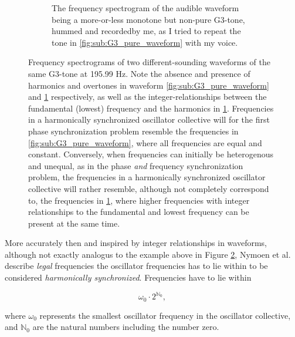 \begin{figure}[ht!]
\begin{subfigure}[t]{.5\textwidth}
		\caption{The frequency spectrogram of the audible waveform being a more-or-less monotone but non-pure G3-tone, hummed and recorded\protect\footnotemark  by me, as I tried to repeat the tone in \ref{fig:sub:G3_pure_waveform} with my voice.}
		\label{fig:sub:G3_hummed_waveform}
	\end{subfigure}
	\caption[Frequency spectrograms illustrating the absence and presence of harmonics and overtones in audible waveforms.]{Frequency spectrograms of two different-sounding waveforms of the same G3-tone at 195.99 Hz. Note the absence and presence of harmonics and overtones in waveform \ref{fig:sub:G3_pure_waveform} and \ref{fig:sub:G3_hummed_waveform} respectively, as well as the integer-relationships between the fundamental (lowest) frequency and the harmonics in \ref{fig:sub:G3_hummed_waveform}. Frequencies in a harmonically synchronized oscillator collective will for the first phase synchronization problem resemble the frequencies in \ref{fig:sub:G3_pure_waveform}, where all frequencies are equal and constant. Conversely, when frequencies can initially be heterogenous and unequal, as in the phase \textit{and} frequency synchronization problem, the frequencies in a harmonically synchronized oscillator collective will rather resemble, although not completely correspond to, the frequencies in \ref{fig:sub:G3_hummed_waveform}, where higher frequencies with integer relationships to the fundamental and lowest frequency can be present at the same time.}
	\label{fig:frequency_spectrograms}
\end{figure}

\addtocounter{footnote}{-2} %


More accurately then and inspired by integer relationships in waveforms, although not exactly analogus to the example above in Figure \ref{fig:frequency_spectrograms}, Nymoen et al. describe \textit{legal} frequencies the oscillator frequencies has to lie within to be considered \textit{harmonically synchronized}. Frequencies have to lie within 

\begin{equation}\label{nymoen_legal_freqs}
\omega_{0} \cdot 2^{\mathbb{N}_0}, 
\end{equation}

where $\omega_0$ represents the smallest oscillator frequency in the oscillator collective, and $\mathbb{N}_0$ are the natural numbers including the number zero.

